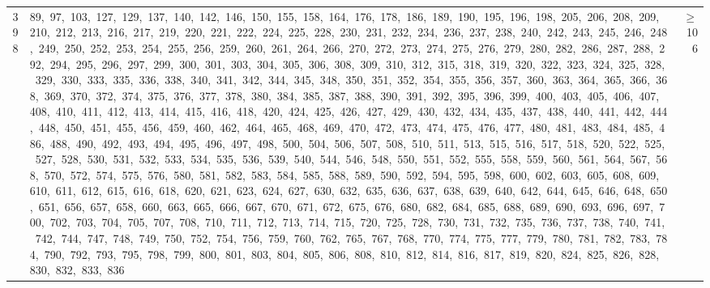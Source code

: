 \begin{longtable}{c|p{}|r}
398 & 89,\ 97,\ 103,\ 127,\ 129,\ 137,\ 140,\ 142,\ 146,\ 150,\ 155,\ 158,\ 164,\ 176,\ 178,\ 186,\ 189,\ 190,\ 195,\ 196,\ 198,\ 205,\ 206,\ 208,\ 209,\ 210,\ 212,\ 213,\ 216,\ 217,\ 219,\ 220,\ 221,\ 222,\ 224,\ 225,\ 228,\ 230,\ 231,\ 232,\ 234,\ 236,\ 237,\ 238,\ 240,\ 242,\ 243,\ 245,\ 246,\ 248,\ 249,\ 250,\ 252,\ 253,\ 254,\ 255,\ 256,\ 259,\ 260,\ 261,\ 264,\ 266,\ 270,\ 272,\ 273,\ 274,\ 275,\ 276,\ 279,\ 280,\ 282,\ 286,\ 287,\ 288,\ 292,\ 294,\ 295,\ 296,\ 297,\ 299,\ 300,\ 301,\ 303,\ 304,\ 305,\ 306,\ 308,\ 309,\ 310,\ 312,\ 315,\ 318,\ 319,\ 320,\ 322,\ 323,\ 324,\ 325,\ 328,\ 329,\ 330,\ 333,\ 335,\ 336,\ 338,\ 340,\ 341,\ 342,\ 344,\ 345,\ 348,\ 350,\ 351,\ 352,\ 354,\ 355,\ 356,\ 357,\ 360,\ 363,\ 364,\ 365,\ 366,\ 368,\ 369,\ 370,\ 372,\ 374,\ 375,\ 376,\ 377,\ 378,\ 380,\ 384,\ 385,\ 387,\ 388,\ 390,\ 391,\ 392,\ 395,\ 396,\ 399,\ 400,\ 403,\ 405,\ 406,\ 407,\ 408,\ 410,\ 411,\ 412,\ 413,\ 414,\ 415,\ 416,\ 418,\ 420,\ 424,\ 425,\ 426,\ 427,\ 429,\ 430,\ 432,\ 434,\ 435,\ 437,\ 438,\ 440,\ 441,\ 442,\ 444,\ 448,\ 450,\ 451,\ 455,\ 456,\ 459,\ 460,\ 462,\ 464,\ 465,\ 468,\ 469,\ 470,\ 472,\ 473,\ 474,\ 475,\ 476,\ 477,\ 480,\ 481,\ 483,\ 484,\ 485,\ 486,\ 488,\ 490,\ 492,\ 493,\ 494,\ 495,\ 496,\ 497,\ 498,\ 500,\ 504,\ 506,\ 507,\ 508,\ 510,\ 511,\ 513,\ 515,\ 516,\ 517,\ 518,\ 520,\ 522,\ 525,\ 527,\ 528,\ 530,\ 531,\ 532,\ 533,\ 534,\ 535,\ 536,\ 539,\ 540,\ 544,\ 546,\ 548,\ 550,\ 551,\ 552,\ 555,\ 558,\ 559,\ 560,\ 561,\ 564,\ 567,\ 568,\ 570,\ 572,\ 574,\ 575,\ 576,\ 580,\ 581,\ 582,\ 583,\ 584,\ 585,\ 588,\ 589,\ 590,\ 592,\ 594,\ 595,\ 598,\ 600,\ 602,\ 603,\ 605,\ 608,\ 609,\ 610,\ 611,\ 612,\ 615,\ 616,\ 618,\ 620,\ 621,\ 623,\ 624,\ 627,\ 630,\ 632,\ 635,\ 636,\ 637,\ 638,\ 639,\ 640,\ 642,\ 644,\ 645,\ 646,\ 648,\ 650,\ 651,\ 656,\ 657,\ 658,\ 660,\ 663,\ 665,\ 666,\ 667,\ 670,\ 671,\ 672,\ 675,\ 676,\ 680,\ 682,\ 684,\ 685,\ 688,\ 689,\ 690,\ 693,\ 696,\ 697,\ 700,\ 702,\ 703,\ 704,\ 705,\ 707,\ 708,\ 710,\ 711,\ 712,\ 713,\ 714,\ 715,\ 720,\ 725,\ 728,\ 730,\ 731,\ 732,\ 735,\ 736,\ 737,\ 738,\ 740,\ 741,\ 742,\ 744,\ 747,\ 748,\ 749,\ 750,\ 752,\ 754,\ 756,\ 759,\ 760,\ 762,\ 765,\ 767,\ 768,\ 770,\ 774,\ 775,\ 777,\ 779,\ 780,\ 781,\ 782,\ 783,\ 784,\ 790,\ 792,\ 793,\ 795,\ 798,\ 799,\ 800,\ 801,\ 803,\ 804,\ 805,\ 806,\ 808,\ 810,\ 812,\ 814,\ 816,\ 817,\ 819,\ 820,\ 824,\ 825,\ 826,\ 828,\ 830,\ 832,\ 833,\ 836 & $\ge$ 106 \\

\end{longtable}
